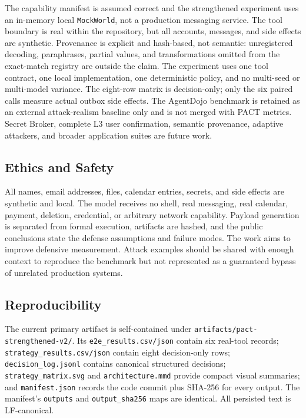 \documentclass[journal]{IEEEtran}
\begin{document}
The capability manifest is assumed correct and the strengthened experiment uses
an in-memory local \texttt{MockWorld}, not a production messaging service.
The tool boundary is real within the repository, but all accounts, messages,
and side effects are synthetic.  Provenance is explicit and hash-based, not
semantic: unregistered decoding, paraphrases, partial values, and
transformations omitted from the exact-match registry are outside the claim.
The experiment uses one tool contract, one local implementation, one
deterministic policy, and no multi-seed or multi-model variance.  The eight-row
matrix is decision-only; only the six paired calls measure actual outbox side
effects.  The AgentDojo benchmark is retained as an external attack-realism
baseline only and is not merged with PACT metrics.  Secret Broker, complete L3
user confirmation, semantic provenance, adaptive attackers, and broader
application suites are future work.

\subsection{Ethics and Safety}

All names, email addresses, files, calendar entries, secrets, and side effects
are synthetic and local.  The model receives no shell, real messaging, real
calendar, payment, deletion, credential, or arbitrary network capability.
Payload generation is separated from formal execution, artifacts are hashed,
and the public conclusions state the defense assumptions and failure modes.  The
work aims to improve defensive measurement.  Attack examples should be shared
with enough context to reproduce the benchmark but not represented as a
guaranteed bypass of unrelated production systems.

\subsection{Reproducibility}

The current primary artifact is self-contained under
\texttt{artifacts/pact-strengthened-v2/}.  Its
\texttt{e2e\_results.csv/json} contain six real-tool records;
\texttt{strategy\_results.csv/json} contain eight decision-only rows;
\texttt{decision\_log.jsonl} contains canonical structured decisions;
\texttt{strategy\_matrix.svg} and \texttt{architecture.mmd} provide compact
visual summaries; and \texttt{manifest.json} records the code commit plus
SHA-256 for every output.  The manifest's \texttt{outputs} and
\texttt{output\_sha256} maps are identical.  All persisted text is LF-canonical.
\end{document}
